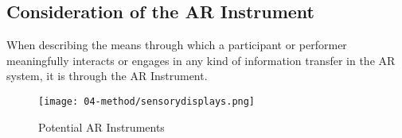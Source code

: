 \subsection{Consideration of the AR Instrument} \label{sec: method-patterns-instrument}
When describing the means through which a participant or performer meaningfully interacts or engages in any kind of information transfer in the AR system, it is through the AR Instrument. 
\begin{figure}
    \centering
    {\texttt{[image: 04-method/sensorydisplays.png]}}
    \caption[Potential AR Instruments]{Potential AR Instruments}
\end{figure}\label{fig: ARinstrument}
